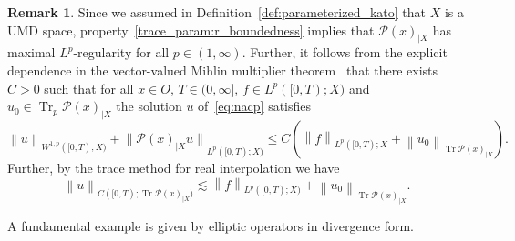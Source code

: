 \documentclass[reqno,a4paper,final]{amsart}
\numberwithin{equation}{section}
\theoremstyle{definition}
\newtheorem{remark}[lemma]{Remark}
\begin{document}
	\begin{remark}\label{rem:uniform_estimate}
		Since we assumed in Definition~\ref{def:parameterized_kato} that $X$ is a UMD space, property~\ref{trace_param:r_boundedness} implies that $\mathcal{P}(x)_{|X}$ has maximal $L^p$-regularity for all $p \in (1, \infty)$. Further, it follows from the explicit dependence in the vector-valued Mihlin multiplier theorem~\cite[Corollary~4.4]{GirWei03b} that there exists $C > 0$ such that for all $x \in O$, $T \in (0,\infty]$, $f \in L^p([0,T);X)$ and $u_0 \in \operatorname{Tr}_p \mathcal{P}(x)_{|X}$ the solution $u$ of~\eqref{eq:nacp} satisfies
		\begin{equation*}
			{\left\lVert{u}\right\rVert}_{W^{1,p}([0,T);X)} + {\lVert{\mathcal{P}(x)_{|X} u}\rVert}_{L^p([0,T);X)} \le C ({\left\lVert{f}\right\rVert}_{L^p([0,T);X} + {\left\lVert{u_0}\right\rVert}_{\operatorname{Tr} \mathcal{P}(x)_{|X}}).
		\end{equation*}
		Further, by the trace method for real interpolation we have
		\begin{equation}
			\label{eq:trace_embedding}
			{\left\lVert{u}\right\rVert}_{C([0,T);\operatorname{Tr} \mathcal{P}(x)_{|X})} \lesssim {\left\lVert{f}\right\rVert}_{L^p([0,T);X)} + {\left\lVert{u_0}\right\rVert}_{\operatorname{Tr} \mathcal{P}(x)_{|X}}.
		\end{equation}
	\end{remark}
	
	 A fundamental example is given by elliptic operators in divergence form.
	 
\end{document}
